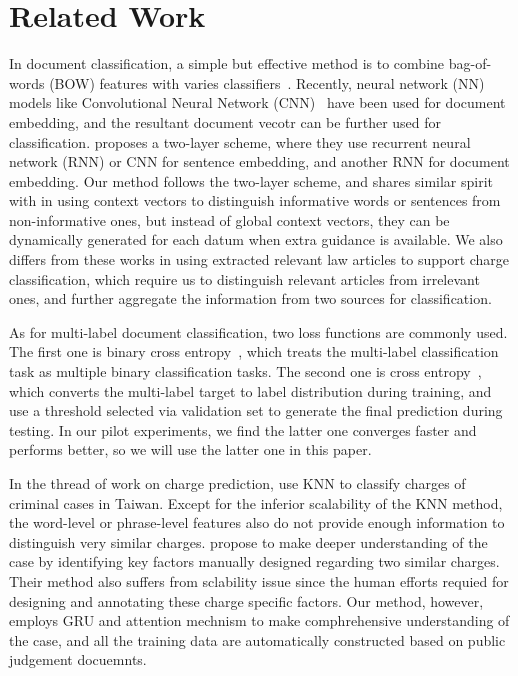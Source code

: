 \section{Related Work}
\label{sec_related_work}
In document classification, a simple but effective method is to combine bag-of-words (BOW) features with varies classifiers~\cite{joachims1998text}. 
Recently, neural network (NN) models like Convolutional Neural Network (CNN)~\cite{kim2014convolutional} have been used for document embedding, and the resultant document vecotr can be further used for classification.
\cite{tang2015document} proposes a two-layer scheme, where they use recurrent neural network (RNN) or CNN for sentence embedding, and another RNN for document embedding.
Our method follows the two-layer scheme, and shares similar spirit with \cite{yang2016hierarchical} in using context vectors to distinguish informative words or sentences from non-informative ones, but instead of global context vectors, they can be dynamically generated for each datum when extra guidance is available.
We also differs from these works in using extracted relevant law articles to support charge classification, which require us to distinguish relevant articles from irrelevant ones, and further aggregate the information from two sources for classification.

As for multi-label document classification, two loss functions are commonly used. 
The first one is binary cross entropy~\cite{nam2014large}, which treats the multi-label classification task as multiple binary classification tasks. 
The second one is cross entropy~\cite{kurata2016improved}, which converts the multi-label target to label distribution during training, and use a threshold selected via validation set to generate the final prediction during testing. In our pilot experiments, we find the latter one converges faster and performs better, so we will use the latter one in this paper.

In the thread of work on charge prediction, \cite{LIU2004case,liu2006exploring} use KNN to classify charges of criminal cases in Taiwan. Except for the inferior scalability of the KNN method, the word-level or phrase-level features also do not provide enough information to distinguish very similar charges. \cite{lin2012exploiting} propose to make deeper understanding of the case by identifying key factors manually designed regarding two similar charges. Their method also suffers from sclability issue since the human efforts requied for designing and annotating these charge specific factors. Our method, however, employs GRU and attention mechnism to make comphrehensive understanding of the case, and all the training data are automatically constructed based on public judgement docuemnts. 

